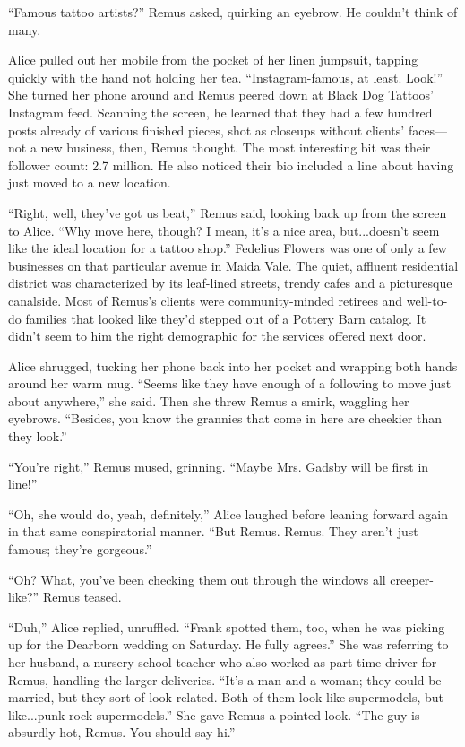 “Famous tattoo artists?” Remus asked, quirking an eyebrow. He couldn’t think of many.

Alice pulled out her mobile from the pocket of her linen jumpsuit, tapping quickly with the hand not holding her tea. “Instagram-famous, at least. Look!” She turned her phone around and Remus peered down at Black Dog Tattoos’ Instagram feed. Scanning the screen, he learned that they had a few hundred posts already of various finished pieces, shot as closeups without clients’ faces—not a new business, then, Remus thought. The most interesting bit was their follower count: 2.7 million. He also noticed their bio included a line about having just moved to a new location.

“Right, well, they’ve got us beat,” Remus said, looking back up from the screen to Alice. “Why move here, though? I mean, it’s a nice area, but...doesn’t seem like the ideal location for a tattoo shop.” Fedelius Flowers was one of only a few businesses on that particular avenue in Maida Vale. The quiet, affluent residential district was characterized by its leaf-lined streets, trendy cafes and a picturesque canalside. Most of Remus’s clients were community-minded retirees and well-to-do families that looked like they’d stepped out of a Pottery Barn catalog. It didn’t seem to him the right demographic for the services offered next door.

Alice shrugged, tucking her phone back into her pocket and wrapping both hands around her warm mug. “Seems like they have enough of a following to move just about anywhere,” she said. Then she threw Remus a smirk, waggling her eyebrows. “Besides, you know the grannies that come in here are cheekier than they look.”

“You’re right,” Remus mused, grinning. “Maybe Mrs. Gadsby will be first in line!”

“Oh, she would do, yeah, definitely,” Alice laughed before leaning forward again in that same conspiratorial manner. “But Remus. Remus. They aren’t just famous; they’re gorgeous.”

“Oh? What, you’ve been checking them out through the windows all creeper-like?” Remus teased.

“Duh,” Alice replied, unruffled. “Frank spotted them, too, when he was picking up for the Dearborn wedding on Saturday. He fully agrees.” She was referring to her husband, a nursery school teacher who also worked as part-time driver for Remus, handling the larger deliveries. “It’s a man and a woman; they could be married, but they sort of look related. Both of them look like supermodels, but like...punk-rock supermodels.” She gave Remus a pointed look. “The guy is absurdly hot, Remus. You should say hi.”

